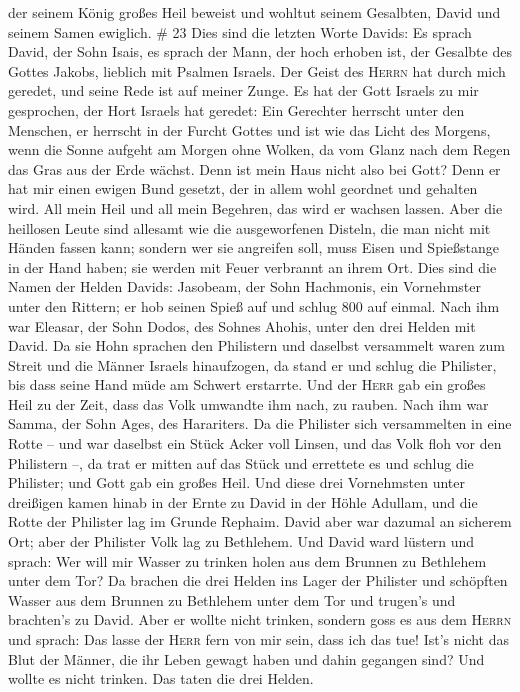  der seinem König großes Heil beweist und wohltut seinem
Gesalbten, David und seinem Samen ewiglich. \# 23  Dies
sind die letzten Worte Davids: Es sprach David, der Sohn Isais, es
sprach der Mann, der hoch erhoben ist, der Gesalbte des Gottes Jakobs,
lieblich mit Psalmen Israels.  Der Geist des
\textsc{Herrn} hat durch mich geredet, und seine Rede ist auf meiner
Zunge.  Es hat der Gott Israels zu mir gesprochen, der
Hort Israels hat geredet: Ein Gerechter herrscht unter den Menschen, er
herrscht in der Furcht Gottes  und ist wie das Licht des
Morgens, wenn die Sonne aufgeht am Morgen ohne Wolken, da vom Glanz nach
dem Regen das Gras aus der Erde wächst.  Denn ist mein
Haus nicht also bei Gott? Denn er hat mir einen ewigen Bund gesetzt, der
in allem wohl geordnet und gehalten wird. All mein Heil und all mein
Begehren, das wird er wachsen lassen.  Aber die heillosen
Leute sind allesamt wie die ausgeworfenen Disteln, die man nicht mit
Händen fassen kann;  sondern wer sie angreifen soll, muss
Eisen und Spießstange in der Hand haben; sie werden mit Feuer verbrannt
an ihrem Ort.  Dies sind die Namen der Helden Davids:
Jasobeam, der Sohn Hachmonis, ein Vornehmster unter den Rittern; er hob
seinen Spieß auf und schlug 800 auf einmal.  Nach ihm war
Eleasar, der Sohn Dodos, des Sohnes Ahohis, unter den drei Helden mit
David. Da sie Hohn sprachen den Philistern und daselbst versammelt waren
zum Streit und die Männer Israels hinaufzogen,  da stand
er und schlug die Philister, bis dass seine Hand müde am Schwert
erstarrte. Und der \textsc{Herr} gab ein großes Heil zu der Zeit, dass
das Volk umwandte ihm nach, zu rauben.  Nach ihm war
Samma, der Sohn Ages, des Harariters. Da die Philister sich versammelten
in eine Rotte -- und war daselbst ein Stück Acker voll Linsen, und das
Volk floh vor den Philistern --,  da trat er mitten auf
das Stück und errettete es und schlug die Philister; und Gott gab ein
großes Heil.  Und diese drei Vornehmsten unter dreißigen
kamen hinab in der Ernte zu David in der Höhle Adullam, und die Rotte
der Philister lag im Grunde Rephaim.  David aber war
dazumal an sicherem Ort; aber der Philister Volk lag zu Bethlehem.
 Und David ward lüstern und sprach: Wer will mir Wasser
zu trinken holen aus dem Brunnen zu Bethlehem unter dem Tor?
 Da brachen die drei Helden ins Lager der Philister und
schöpften Wasser aus dem Brunnen zu Bethlehem unter dem Tor und trugen's
und brachten's zu David. Aber er wollte nicht trinken, sondern goss es
aus dem \textsc{Herrn}  und sprach: Das lasse der
\textsc{Herr} fern von mir sein, dass ich das tue! Ist's nicht das Blut
der Männer, die ihr Leben gewagt haben und dahin gegangen sind? Und
wollte es nicht trinken. Das taten die drei Helden.

